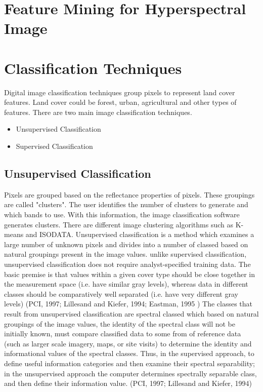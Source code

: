 \documentclass[document.tex]{subfiles}
\begin{document}
\section{Feature Mining for Hyperspectral Image}

\section{Classification Techniques}
\noindent Digital image classification techniques group pixels to represent land cover features. Land cover could be forest, urban, agricultural and other types of features. There are two main image classification techniques.
\begin{itemize}
	\item Unsupervised Classification
	\item Supervised Classification
\end{itemize}
\subsection{Unsupervised Classification}
\noindent Pixels are grouped based on the reflectance properties of pixels. These groupings are
called "clusters". The user identifies the number of clusters to generate and which bands
to use. With this information, the image classification software generates clusters. There
are different image clustering algorithms such as K-means and ISODATA.
Unsupervised classification is a method which examines a large number of unknown pixels and divides into a number of classed based on natural groupings present in the image values. unlike supervised classification, unsupervised classification does not require
analyst-specified training data. The basic premise is that values within a given cover
type should be close together in the measurement space (i.e. have similar gray levels),
whereas data in different classes should be comparatively well separated (i.e. have very
different gray levels) (PCI, 1997; Lillesand and Kiefer, 1994; Eastman, 1995 )
The classes that result from unsupervised classification are spectral classed which based on natural groupings of the image values, the identity of the spectral class will not be initially known, must compare classified data to some from of reference data (such as larger
scale imagery, maps, or site visits) to determine the identity and informational values
of the spectral classes. Thus, in the supervised approach, to define useful information
categories and then examine their spectral separability; in the unsupervised approach the
computer determines spectrally separable class, and then define their information value.
(PCI, 1997; Lillesand and Kiefer, 1994)
\end{document}
